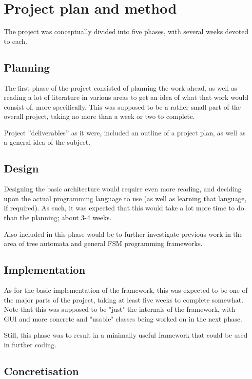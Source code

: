\section{Project plan and method}

The project was conceptually divided into five phases, with several weeks
devoted to each.

\subsection{Planning}

The first phase of the project consisted of planning the work ahead, as
well as reading a lot of literature in various areas to get an idea of what
that work would consist of, more specifically. This was supposed to be a
rather small part of the overall project, taking no more than a week or two
to complete.

Project ''deliverables'' as it were, included an outline of a project plan,
as well as a general idea of the subject.

\subsection{Design}

Designing the basic architecture would require even more reading, and
deciding upon the actual programming language to use (as well as learning
that language, if required). As such, it was expected that this would take
a lot more time to do than the planning; about 3-4 weeks.

Also included in this phase would be to further investigate previous work
in the area of tree automata and general FSM programming frameworks.

\subsection{Implementation}

As for the basic implementation of the framework, this was expected to be
one of the major parts of the project, taking at least five weeks to
complete somewhat. Note that this was supposed to be "just" the internals
of the framework, with GUI and more concrete and "usable" classes being
worked on in the next phase.

Still, this phase was to result in a minimally useful framework that could
be used in further coding.

\subsection{Concretisation}

